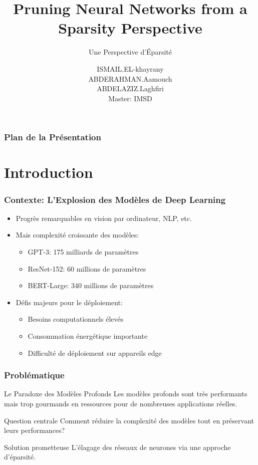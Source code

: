 \documentclass[10pt]{beamer}
\title{Pruning Neural Networks from a Sparsity Perspective}
\subtitle{Une Perspective d'Éparsité}
\author{ISMAIL.EL-khayrany \\ ABDERAHMAN.Aamouch \\ ABDELAZIZ.Laghfiri\\ Master: IMSD}
\institute{Université Ibn Zohr/ FPO}
\begin{document}
\frame{\titlepage}

\begin{frame}
\frametitle{Plan de la Présentation}
\tableofcontents
\end{frame}

\section{Introduction}

\begin{frame}
\frametitle{Contexte: L'Explosion des Modèles de Deep Learning}
\begin{itemize}
    \item Progrès remarquables en vision par ordinateur, NLP, etc.
    \item Mais complexité croissante des modèles:
    \begin{itemize}
        \item GPT-3: 175 milliards de paramètres
        \item ResNet-152: 60 millions de paramètres
        \item BERT-Large: 340 millions de paramètres
    \end{itemize}
    \item Défis majeurs pour le déploiement:
    \begin{itemize}
        \item Besoins computationnels élevés
        \item Consommation énergétique importante
        \item Difficulté de déploiement sur appareils edge
    \end{itemize}
\end{itemize}
\end{frame}

\begin{frame}
\frametitle{Problématique}
\begin{block}{Le Paradoxe des Modèles Profonds}
Les modèles profonds sont très performants mais trop gourmands en ressources pour de nombreuses applications réelles.
\end{block}

\begin{exampleblock}{Question centrale}
Comment réduire la complexité des modèles tout en préservant leurs performances?
\end{exampleblock}

\begin{alertblock}{Solution prometteuse}
L'élagage des réseaux de neurones via une approche d'éparsité.
\end{alertblock}
\end{frame}
\end{document}
